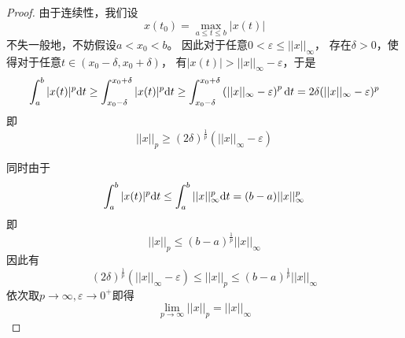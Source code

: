 \documentclass[cn]{homework}
\begin{document}
    \problem
    \begin{proof}
        由于连续性，我们设
        \[x(t_0)=\max_{a\leq t\leq b}|x(t)|\]
        不失一般地，不妨假设$a<x_0<b$。
        因此对于任意$0<\varepsilon\leq||x||_\infty$，
        存在$\delta>0$，使得对于任意$t\in(x_0-\delta,x_0+\delta)$，
        有$|x(t)|>||x||_\infty-\varepsilon$，于是
        \[\int_a^b|x(t)|^p\mathrm d t
        \geq\int_{x_0-\delta}^{x_0+\delta}|x(t)|^p\mathrm d t
        \geq\int_{x_0-\delta}^{x_0+\delta}
        \left(||x||_\infty-\varepsilon\right)^p\mathrm d t
        =2\delta(||x||_\infty-\varepsilon)^p\]
        即
        \[||x||_p\geq(2\delta)^\frac{1}{p}(||x||_\infty-\varepsilon)\]
        
        同时由于
        \[\int_a^b|x(t)|^p\mathrm d t\leq\int_a^b||x||_\infty^p\mathrm d t
        =(b-a)||x||_\infty^p\]
        即
        \[||x||_p\leq(b-a)^\frac{1}{p}||x||_\infty\]
        因此有
        \[(2\delta)^\frac{1}{p}(||x||_\infty-\varepsilon)
        \leq||x||_p\leq(b-a)^\frac{1}{p}||x||_\infty\]
        依次取$p\to\infty,\varepsilon\to0^+$即得
        \[\lim_{p\to\infty}||x||_p=||x||_\infty\]
    \end{proof}
\end{document}
